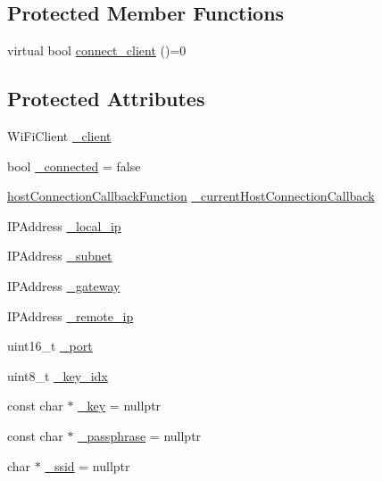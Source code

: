 \subsection*{Protected Member Functions}
\begin{DoxyCompactItemize}
\item 
virtual bool \hyperlink{class_wi_fi_stream_a2e530346a7edea0326ad2025be42aff1}{connect\+\_\+client} ()=0
\end{DoxyCompactItemize}
\subsection*{Protected Attributes}
\begin{DoxyCompactItemize}
\item 
Wi\+Fi\+Client \hyperlink{class_wi_fi_stream_a260e92c25849c88a0d370672eaf390e7}{\+\_\+client}
\item 
bool \hyperlink{class_wi_fi_stream_abe0341617945c15f2a37d34d7be7e72c}{\+\_\+connected} = false
\item 
\hyperlink{_wi_fi_stream_8h_ac590658d84d43947d605be50ab5fbc85}{host\+Connection\+Callback\+Function} \hyperlink{class_wi_fi_stream_aa5e5f3cc7bf2e91bf5ee9793fe6a1335}{\+\_\+current\+Host\+Connection\+Callback}
\item 
I\+P\+Address \hyperlink{class_wi_fi_stream_a9e5cfe85f7ff186e597e2eb09a75e742}{\+\_\+local\+\_\+ip}
\item 
I\+P\+Address \hyperlink{class_wi_fi_stream_aa37dbf267daa7afa939183cd77bb5ee7}{\+\_\+subnet}
\item 
I\+P\+Address \hyperlink{class_wi_fi_stream_aee2b9bf291669692faf0c9d52c8dca1d}{\+\_\+gateway}
\item 
I\+P\+Address \hyperlink{class_wi_fi_stream_af81541aec7d6be3be1466caf8bc68820}{\+\_\+remote\+\_\+ip}
\item 
uint16\+\_\+t \hyperlink{class_wi_fi_stream_aa1137c9058f501876b0967db2baf898a}{\+\_\+port}
\item 
uint8\+\_\+t \hyperlink{class_wi_fi_stream_a78fb4d153bfabad324535db5e495d71b}{\+\_\+key\+\_\+idx}
\item 
const char $\ast$ \hyperlink{class_wi_fi_stream_ad8d316924c56442f88a85f714a2a6e95}{\+\_\+key} = nullptr
\item 
const char $\ast$ \hyperlink{class_wi_fi_stream_a56fb4c68bcf7312361a8fad4328826de}{\+\_\+passphrase} = nullptr
\item 
char $\ast$ \hyperlink{class_wi_fi_stream_a428e3d50bc45a3f2de02d7edc7d9509d}{\+\_\+ssid} = nullptr
\end{DoxyCompactItemize}


